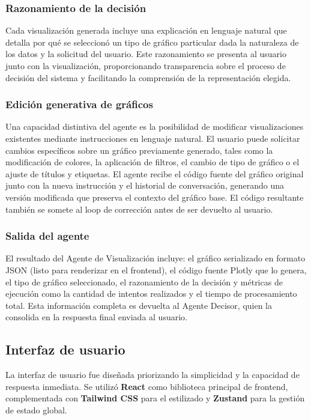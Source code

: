 \subsubsection{Razonamiento de la decisión}

Cada visualización generada incluye una explicación en lenguaje natural que
detalla por qué se seleccionó un tipo de gráfico particular dada la naturaleza
de los datos y la solicitud del usuario. Este razonamiento se presenta al
usuario junto con la visualización, proporcionando transparencia sobre el
proceso de decisión del sistema y facilitando la comprensión de la
representación elegida.

\subsubsection{Edición generativa de gráficos}

Una capacidad distintiva del agente es la posibilidad de modificar
visualizaciones existentes mediante instrucciones en lenguaje natural. El
usuario puede solicitar cambios específicos sobre un gráfico previamente
generado, tales como la modificación de colores, la aplicación de filtros, el
cambio de tipo de gráfico o el ajuste de títulos y etiquetas. El agente recibe
el código fuente del gráfico original junto con la nueva instrucción y el
historial de conversación, generando una versión modificada que preserva el
contexto del gráfico base. El código resultante también se somete al loop de
corrección antes de ser devuelto al usuario.

\subsubsection{Salida del agente}

El resultado del Agente de Visualización incluye: el gráfico serializado en
formato JSON (listo para renderizar en el frontend), el código fuente Plotly
que lo genera, el tipo de gráfico seleccionado, el razonamiento de la decisión
y métricas de ejecución como la cantidad de intentos realizados y el tiempo de
procesamiento total. Esta información completa es devuelta al Agente Decisor,
quien la consolida en la respuesta final enviada al usuario.

\FloatBarrier
\subsection{Interfaz de usuario}

La interfaz de usuario fue diseñada priorizando la simplicidad y la capacidad
de respuesta inmediata. Se utilizó \textbf{React} como biblioteca principal de
frontend, complementada con \textbf{Tailwind CSS} para el estilizado y
\textbf{Zustand} para la gestión de estado global.

